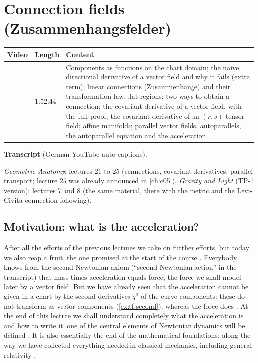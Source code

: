 \chapter{Connection fields (Zusammenhangsfelder)}\label{ch:c06}
\begin{paracol}{2}

\begin{sources}
\begin{tabularx}{\linewidth}{@{}l l L@{}}
\toprule
\textbf{Video} & \textbf{Length} & \textbf{Content}\\
\midrule
{} & 1:52:44 & Components as functions on the chart domain; the
naive directional derivative of a vector field and why it fails (extra term); linear connections (Zusammenh\"ange) and their
transformation law, flat regions; two ways to obtain a connection; the covariant derivative of a vector field, with the full
proof; the covariant derivative of an $(r,s)$ tensor field; affine manifolds; parallel vector fields, autoparallels, the
autoparallel equation and the acceleration.\\
\bottomrule
\end{tabularx}

\smallskip
\textbf{Transcript}  (German YouTube auto-captions).
\end{sources}

\begin{reading}
\emph{Geometric Anatomy}: lectures 21 to 25 (connections, covariant derivatives, parallel transport; lecture 25 was
already announced in \cref{ch:c05}). \emph{Gravity and Light} (TP-1 version): lectures 7 and 8 (the same material, there
with the metric and the Levi-Civita connection following).
\end{reading}

\section{Motivation: what is the acceleration?}\label{sec:cf-motivation}

After all the efforts of the previous lectures we take on further efforts, but today we also reap a fruit, the one promised at
the start of the course . Everybody knows from the second Newtonian axiom (``second Newtonian
action'' in the transcript) that mass times acceleration equals force; the force we shall model later by a vector field. But
we have already seen that the acceleration cannot be given in a chart by the second derivatives $\ddot q^a$ of the curve
components: these do not transform as vector components (\cref{ex:tf-second}), whereas the force does
.
At the end of this lecture we shall understand completely what the acceleration is and how to write it: one of the central
elements of Newtonian dynamics will be defined .
It is also essentially the end of the mathematical foundations: along the way we have collected everything needed in
classical mechanics, including general relativity .


\end{paracol}
